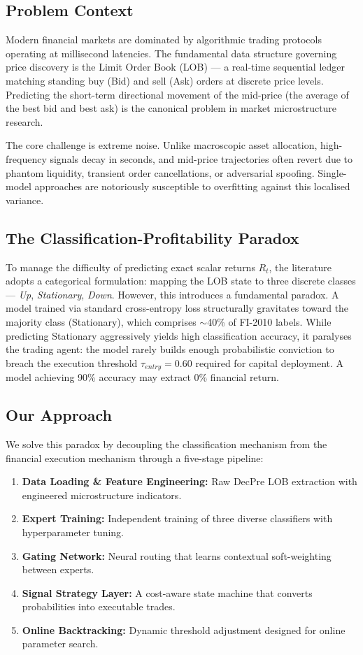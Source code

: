 \documentclass[conference]{IEEEtran}
\begin{document}
\subsection{Problem Context}
Modern financial markets are dominated by algorithmic trading protocols
operating at millisecond latencies. The fundamental data structure governing
price discovery is the Limit Order Book (LOB) --- a real-time sequential
ledger matching standing buy (Bid) and sell (Ask) orders at discrete price
levels. Predicting the short-term directional movement of the mid-price
(the average of the best bid and best ask) is the canonical problem in
market microstructure research.

The core challenge is extreme noise. Unlike macroscopic asset allocation,
high-frequency signals decay in seconds, and mid-price trajectories often
revert due to phantom liquidity, transient order cancellations, or
adversarial spoofing. Single-model approaches are notoriously susceptible
to overfitting against this localised variance.

\subsection{The Classification-Profitability Paradox}
To manage the difficulty of predicting exact scalar returns $R_t$,
the literature adopts a categorical formulation: mapping the LOB state to
three discrete classes --- \textit{Up}, \textit{Stationary}, \textit{Down}.
However, this introduces a fundamental paradox. A model trained via
standard cross-entropy loss structurally gravitates toward the majority
class (Stationary), which comprises $\sim$40\% of FI-2010 labels. While
predicting Stationary aggressively yields high classification accuracy,
it paralyses the trading agent: the model rarely builds enough
probabilistic conviction to breach the execution threshold
$\tau_{entry}=0.60$ required for capital deployment. A model achieving
90\% accuracy may extract 0\% financial return.

\subsection{Our Approach}
We solve this paradox by decoupling the classification mechanism from
the financial execution mechanism through a five-stage pipeline:
\begin{enumerate}
    \item \textbf{Data Loading \& Feature Engineering:} Raw DecPre LOB extraction with engineered microstructure indicators.
    \item \textbf{Expert Training:} Independent training of three diverse classifiers with hyperparameter tuning.
    \item \textbf{Gating Network:} Neural routing that learns contextual soft-weighting between experts.
    \item \textbf{Signal Strategy Layer:} A cost-aware state machine that converts probabilities into executable trades.
    \item \textbf{Online Backtracking:} Dynamic threshold adjustment designed for online parameter search.
\end{enumerate}
\end{document}
